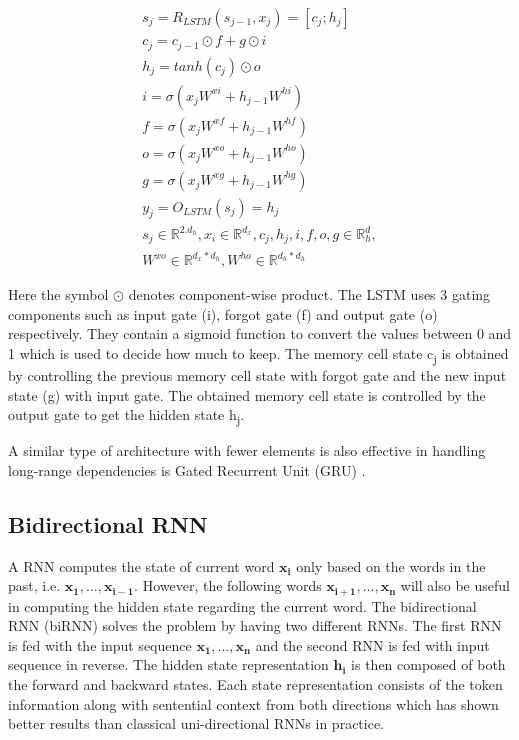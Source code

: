 \documentclass[a4paper, 11pt]{article}
\begin{document}
\begin{align*} \label{lstm_equation}
s_j = R_{LSTM}(s_{j-1},x_j) = [c_j;h_j] \\
c_j = c_{j-1} \odot f + g \odot i \\
h_j = tanh(c_j) \odot o \\
i = \sigma(x_jW^{xi} + h_{j-1} W^{hi}) \\
f = \sigma(x_jW^{xf} + h_{j-1} W^{hf}) \\
o = \sigma(x_jW^{xo} + h_{j-1} W^{ho}) \\
g = \sigma(x_jW^{xg} + h_{j-1} W^{hg}) \\
y_j = O_{LSTM}(s_j) = h_j \\
s_j \in \mathbb{R}^{2.d_h},   x_i \in \mathbb{R}^{d_x},  c_j,h_j,i,f,o,g \in \mathbb{R}^d_h, \\
W^{xo} \in \mathbb{R}^{d_x*d_h},  W^{ho} \in \mathbb{R}^{d_h*d_h}
\end{align*}

Here the symbol $\odot$ denotes component-wise product. The LSTM uses 3 gating components such as input gate (i), forgot gate (f) and output gate (o) respectively. They contain a sigmoid function to convert the values between 0 and 1 which is used to decide how much to keep. The memory cell state c\textsubscript{j} is obtained by controlling the previous memory cell state with forgot gate and the new input state (g) with input gate. The obtained memory cell state is controlled by the output gate to get the hidden state h\textsubscript{j}.

A similar type of architecture with fewer elements is also effective in handling long-range dependencies is Gated Recurrent Unit (GRU) \parencite{cho2014learning}.

\subsection{Bidirectional RNN}
A RNN computes the state of current word $\mathbf{x_{i}}$ only based on the words in the past, i.e. $\mathrm{\mathbf{x_1},\dots,\mathbf{x_{i-1}}}$. However, the following words $\mathrm{\mathbf{x_{i+1}},\dots,\mathbf{x_{n}}}$ will also be useful in computing the hidden state regarding the current word. The bidirectional RNN (biRNN) \parencite{bidirectionalRNN} solves the problem by having two different RNNs. The first RNN is fed with the input sequence $\mathrm{\mathbf{x_{1}},\dots,\mathbf{x_{n}}}$ and the second RNN is fed with input sequence in reverse. The hidden state representation $\mathbf{h_{i}}$ is then composed of both the forward and backward states. Each state representation consists of the token information along with sentential context from both directions which has shown better results than classical uni-directional RNNs in practice.
\end{document}
